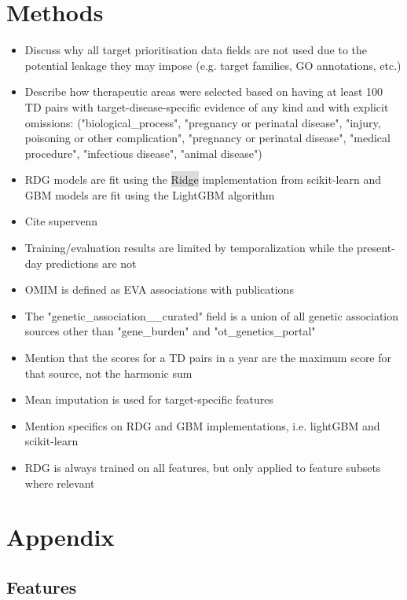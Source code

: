 \documentclass{article}
\begin{document}
\section{Methods}
\label{sec:methods}

\begin{itemize}
  \item Discuss why all target prioritisation data fields are not used due to the potential leakage they may impose (e.g. target families, GO annotations, etc.)
  \item Describe how therapeutic areas were selected based on having at least 100 TD pairs with target-disease-specific evidence of any kind and with explicit omissions: ("biological\_process", "pregnancy or perinatal disease", "injury, poisoning or other complication", "pregnancy or perinatal disease", "medical procedure", "infectious disease", "animal disease")
  \item RDG models are fit using the \colorbox{Gainsboro}{Ridge} implementation from scikit-learn and GBM models are fit using the LightGBM \cite{LightGBM} algorithm
  \item Cite supervenn
  \item Training/evaluation results are limited by temporalization while the present-day predictions are not
  \item OMIM is defined as EVA associations with publications
  \item The "genetic\_association\_\_curated" field is a union of all genetic association sources other than "gene\_burden" and "ot\_genetics\_portal"
  \item Mention that the scores for a TD pairs in a year are the maximum score for that source, not the harmonic sum
  \item Mean imputation is used for target-specific features
  \item Mention specifics on RDG and GBM implementations, i.e. lightGBM and scikit-learn
  \item RDG is always trained on all features, but only applied to feature subsets where relevant
\end{itemize} 

\section{Appendix}

\subsection{Features}
\end{document}

